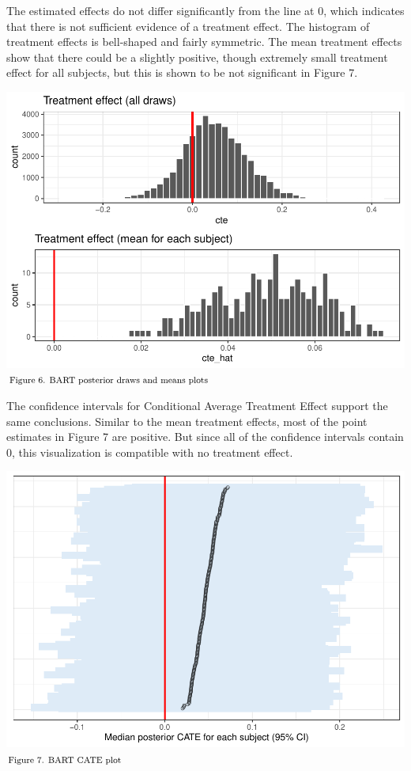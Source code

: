 \documentclass[12pt]{article}
\begin{document}
The estimated effects do not differ significantly from the line at 0,
which indicates that there is not sufficient evidence of a treatment
effect. The histogram of treatment effects is bell-shaped and fairly
symmetric. The mean treatment effects show that there could be a
slightly positive, though extremely small treatment effect for all
subjects, but this is shown to be not significant in Figure 7.

\includegraphics{journal-article-nb_files/figure-latex/bart-plots-1.pdf}
\(\hspace*{\fill} \footnotesize \text{Figure 6. BART posterior draws and means plots}\)

The confidence intervals for Conditional Average Treatment Effect
support the same conclusions. Similar to the mean treatment effects,
most of the point estimates in Figure 7 are positive. But since all of
the confidence intervals contain 0, this visualization is compatible
with no treatment effect.

\includegraphics{journal-article-nb_files/figure-latex/bart-cates-1.pdf}
\(\hspace*{\fill} \footnotesize \text{Figure 7. BART CATE plot}\)
\end{document}
